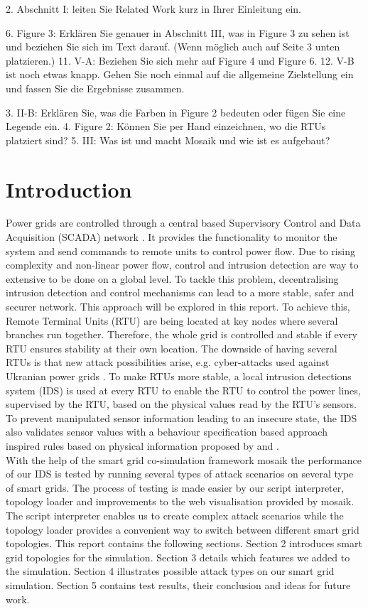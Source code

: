 2. Abschnitt I: leiten Sie Related Work kurz in Ihrer Einleitung ein.

6. Figure 3: Erklären Sie genauer in Abschnitt III, was in Figure 3 zu sehen ist und beziehen Sie sich im Text darauf. (Wenn möglich auch auf Seite 3 unten platzieren.)
11. V-A: Beziehen Sie sich mehr auf Figure 4 und Figure 6.
12. V-B ist noch etwas knapp. Gehen Sie noch einmal auf die allgemeine Zielstellung ein und fassen Sie die Ergebnisse zusammen.

3. II-B: Erklären Sie, was die Farben in Figure 2 bedeuten oder fügen Sie eine Legende ein.
4. Figure 2: Können Sie per Hand einzeichnen, wo die RTUs platziert sind?
5. III: Was ist und macht Mosaik und wie ist es aufgebaut?

\section{Introduction}

	Power grids are controlled through a central based Supervisory Control and Data Acquisition (SCADA) network \cite{chromik1}. It provides the functionality to monitor the system and send commands to remote units to control power flow. Due to rising complexity and non-linear power flow, control and intrusion detection are way to extensive to be done on a global level. To tackle this problem, decentralising intrusion detection and control mechanisms can lead to a more stable, safer and securer network. This approach will be explored in this report. To achieve this, Remote Terminal Units (RTU) are being located at key nodes where several branches run together. Therefore, the whole grid is controlled and stable if every RTU ensures stability at their own location. The downside of having several RTUs is that new attack possibilities arise, e.g. cyber-attacks used against Ukranian power grids \cite{icscert}. To make RTUs more stable, a local intrusion detections system (IDS) is used at every RTU to enable the RTU to control the power lines, supervised by the RTU, based on the physical values read by the RTU's sensors. To prevent manipulated sensor information leading to an insecure state, the IDS also validates sensor values with a behaviour specification based approach inspired rules based on physical information proposed by \cite{chromik1} and \cite{blithe}. \\
	With the help of the smart grid co-simulation framework mosaik the performance of our IDS is tested by running several types of attack scenarios on several type of smart grids. The process of testing is made easier by our script interpreter, topology loader and improvements to the web visualisation provided by mosaik. The script interpreter enables us to create complex attack scenarios while the topology loader provides a convenient way to switch between different smart grid topologies. This report contains the following sections. Section 2 introduces smart grid topologies for the simulation. Section 3 details which features we added to the simulation. Section 4 illustrates possible attack types on our smart grid simulation. Section 5 contains test results, their conclusion and ideas for future work.

